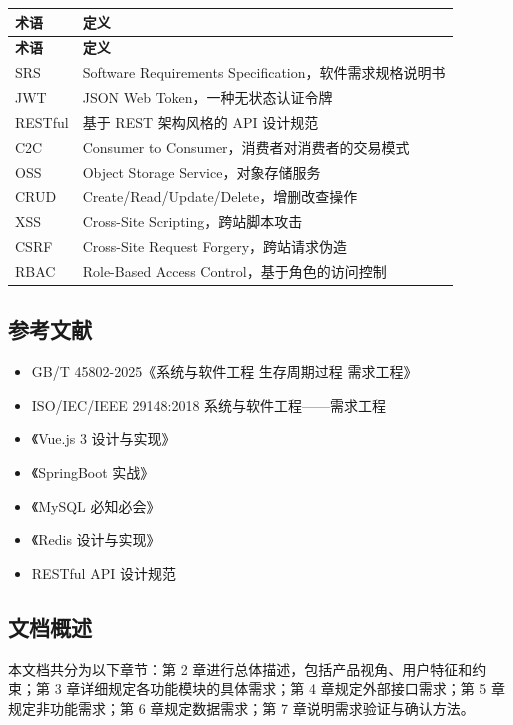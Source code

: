 \documentclass[12pt,a4paper,UTF8]{ctexart}
\begin{document}
\begin{longtable}{p{}|p{}}
    \toprule
    \textbf{术语} & \textbf{定义} \\
    \midrule
    \endfirsthead
    \toprule
    \textbf{术语} & \textbf{定义} \\
    \midrule
    \endhead
    \bottomrule
    \endfoot

    SRS & Software Requirements Specification，软件需求规格说明书 \\
    JWT & JSON Web Token，一种无状态认证令牌 \\
    RESTful & 基于 REST 架构风格的 API 设计规范 \\
    C2C & Consumer to Consumer，消费者对消费者的交易模式 \\
    OSS & Object Storage Service，对象存储服务 \\
    CRUD & Create/Read/Update/Delete，增删改查操作 \\
    XSS & Cross-Site Scripting，跨站脚本攻击 \\
    CSRF & Cross-Site Request Forgery，跨站请求伪造 \\
    RBAC & Role-Based Access Control，基于角色的访问控制 \\
\end{longtable}

\subsection{参考文献}

\begin{itemize}[itemsep=3pt]
    \item GB/T 45802-2025《系统与软件工程 生存周期过程 需求工程》
    \item ISO/IEC/IEEE 29148:2018 系统与软件工程——需求工程
    \item 《Vue.js 3 设计与实现》
    \item 《SpringBoot 实战》
    \item 《MySQL 必知必会》
    \item 《Redis 设计与实现》
    \item RESTful API 设计规范
\end{itemize}

\subsection{文档概述}

本文档共分为以下章节：第 2 章进行总体描述，包括产品视角、用户特征和约束；第 3 章详细规定各功能模块的具体需求；第 4 章规定外部接口需求；第 5 章规定非功能需求；第 6 章规定数据需求；第 7 章说明需求验证与确认方法。
\end{document}
